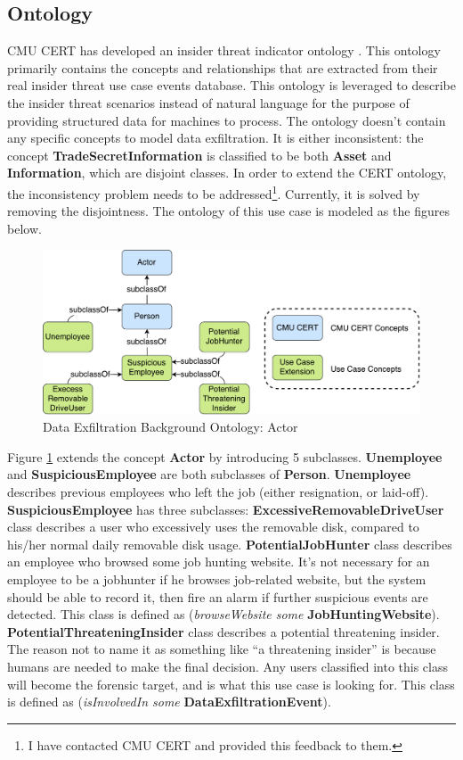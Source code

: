 \subsection{Ontology}
CMU CERT has developed an insider threat indicator ontology \cite{costa2014ontology}.
This ontology primarily contains the concepts and relationships that are extracted from their real insider threat use case events database. 
This ontology is leveraged to describe the insider threat scenarios instead of natural language for the purpose of providing structured data for machines to process. 
The ontology doesn't contain any specific concepts to model data exfiltration. 
It is either inconsistent: 
the concept \textbf{TradeSecretInformation} is classified to be both \textbf{Asset} and \textbf{Information}, which are disjoint classes.
In order to extend the CERT ontology, the inconsistency problem needs to be addressed\footnote{I have contacted CMU CERT and provided this feedback to them.}. 
Currently, it is solved by removing the disjointness.
The ontology of this use case is modeled as the figures below. 

\begin{figure}[!htbp]
	\centering
    \includegraphics[width=5in]{img/5-dxoactor.pdf}
    \caption{Data Exfiltration Background Ontology: Actor}
    \label{fig:actor}
\end{figure}

Figure \ref{fig:actor} extends the concept \textbf{Actor} by introducing 5 subclasses. 
\textbf{Unemployee} and \textbf{SuspiciousEmployee} are both subclasses of \textbf{Person}.
\textbf{Unemployee} describes previous employees who left the job (either resignation, or laid-off). 
\textbf{SuspiciousEmployee} has three subclasses:
\textbf{ExcessiveRemovableDriveUser} class describes a user who excessively uses the removable disk, compared to his/her normal daily removable disk usage. 
\textbf{PotentialJobHunter} class describes an employee who browsed some job hunting website. 
It's not necessary for an employee to be a jobhunter if he browses job-related website, but the system should be able to record it, then fire an alarm if further suspicious events are detected. 
This class is defined as (\textit{browseWebsite some} \textbf{JobHuntingWebsite}). 
\textbf{PotentialThreateningInsider} class describes a potential threatening insider.
The reason not to name it as something like ``a threatening insider'' is because humans are needed to make the final decision. 
Any users classified into this class will become the forensic target, and is what this use case is looking for. 
This class is defined as (\textit{isInvolvedIn some} \textbf{DataExfiltrationEvent}). 


